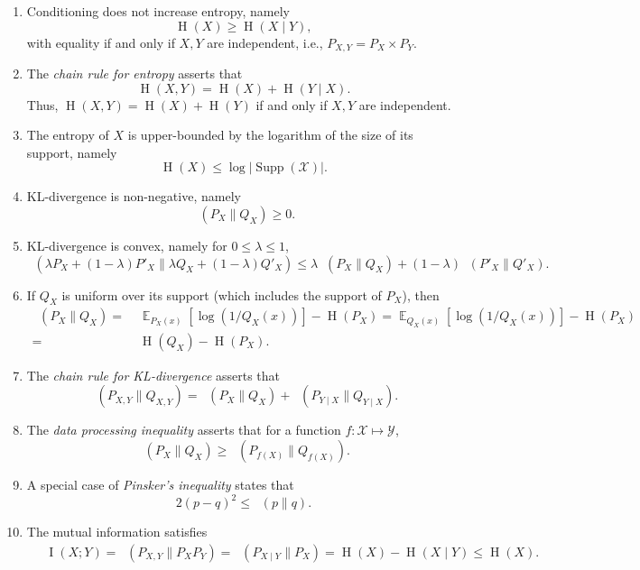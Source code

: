 \documentclass[10pt,a4paper]{amsart}
\DeclareMathOperator*{\E}{\mathbb{E}}
\DeclareMathOperator{\HH}{H}
\DeclareMathOperator{\I}{I}
\DeclareMathOperator{\KL}{D_{\text{KL}}}
\DeclareMathOperator{\Supp}{\text{Supp}}
\begin{document}
\begin{enumerate}[label=(\arabic*), ref=\text{Property (}\arabic*\text{)}]
  \item \label{prope:conditioned entropy} Conditioning does not increase entropy, namely
$$\HH(X) \geq \HH(X \mid Y ),$$
   with equality if and only if $X,Y$ are independent, i.e., $P_{X,Y} = P_X \times P_Y$.
  \item \label{prope:chain rule entropy} The \emph{chain rule for entropy} asserts that $$\HH(X,Y) = \HH(X) + \HH(Y \mid X).$$
Thus, $\HH(X,Y) = \HH(X) + \HH(Y)$ if and only if $X,Y$ are independent.
  \item \label{prope:entropy bound} The entropy of $X$ is upper-bounded by the logarithm of the size of its support, namely
  $$\HH(X) \leq \log|\Supp(\mathcal{X})|.$$
  \item \label{prope:kl nonnegative} KL-divergence is non-negative, namely $$\KL(P_{X} \| Q_{X}) \geq 0.$$
  \item \label{prope:kl convex} KL-divergence is convex, namely for $0 \leq \lambda \le 1$,
  $$\KL( \lambda P_X + (1 - \lambda) P'_X \| \lambda Q_X + (1 - \lambda)Q'_X ) \leq
  \lambda \KL( P_X \| Q_X ) + (1 - \lambda) \KL( P'_X \| Q'_X ).$$
  \item \label{prope:kl and entropy} If $Q_X$ is uniform  over its support (which includes the support of $P_X$), then
    \begin{align*}
    \KL( P_X \| Q_X ) = &\; \E_{P_X(x)}[\log(1/ Q_X(x))] - \HH(P_X) = \E_{Q_X(x)}[\log(1/ Q_X(x))] - \HH(P_X) \\
    = &\; 
    \HH(Q_X) - \HH(P_X).
    \end{align*}
  \item \label{prope:chain rule kl} The \emph{chain rule for KL-divergence} asserts that
  $$\KL( P_{X,Y} \| Q_{X,Y}) =  \KL( P_X \| Q_X ) + \KL( P_{Y \mid X} \| Q_{Y \mid X} ) .$$
  \item \label{prope:data processing}
  The \emph{data processing inequality} asserts that for a function $f: \mathcal{X} \mapsto \mathcal{Y}$,
  $$\KL( P_X \| Q_X) \geq \KL( P_{f(X)} \| Q_{f(X)} ).$$
\item \label{prope:pinsker}
A special case of \emph{Pinsker's inequality} states that
  $$2 (p - q)^2 \leq \KL(p \| q ).$$
  \item \label{prope:information bound} The mutual information satisfies
  \begin{align*}
  &\; \I(X ; Y) = \KL(P_{X,Y} \| P_X P_Y) = 
  \KL(P_{X \mid Y} \| P_X) = \HH(X) - \HH(X \mid Y) \leq 
  \HH(X).
  \end{align*}
\end{enumerate}
\end{document}
